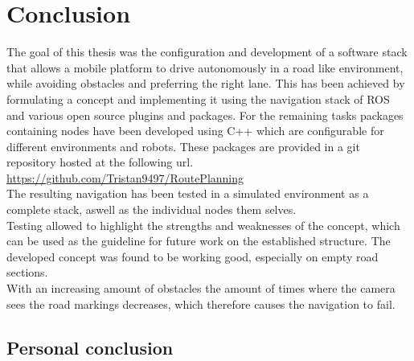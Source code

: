 \chapter{Conclusion}
\label{Conclusion}
The goal of this thesis was the configuration and development of a software stack that allows a mobile platform to drive autonomously in a road like environment, while avoiding obstacles and preferring the right lane.
This has been achieved by formulating a concept and implementing it using the navigation stack of ROS and various open source plugins and packages.
For the remaining tasks packages containing nodes have been developed using C++ which are configurable for different environments and robots. These packages are provided in a git repository hosted at the following url.\\

\url{https://github.com/Tristan9497/RoutePlanning}\\

The resulting navigation has been tested in a simulated environment as a complete stack, aswell as the individual nodes them selves.\\

Testing allowed to highlight the strengths and weaknesses of the concept, which can be used as the guideline for future work on the established structure. The developed concept was found to be working good, especially on empty road sections.\\

With an increasing amount of obstacles the amount of times where the camera sees the road markings decreases, which therefore causes the navigation to fail.


\section{Personal conclusion}





